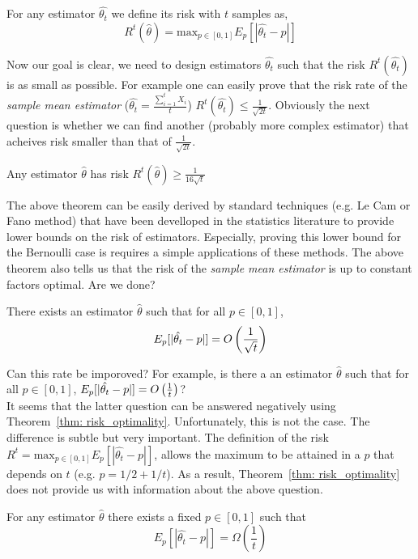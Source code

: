 \begin{definition}
For any estimator $\hat{\theta_t}$ we define its risk with $t$ samples as, $$R^t(\hat{\theta})=\text{max}_{p \in [0,1]}E_p[|\hat{\theta_t} - p|]$$
\end{definition}Now our goal is clear, we need to design estimators $\hat{\theta_t}$ such that the risk $R^t(\hat{\theta_t})$ is as small as possible. For example one can easily prove that the risk rate of the \emph{sample mean estimator} ($\hat{\theta_t}= \frac{\sum_{i=1}^t X_i}{t}$) $R^t(\hat{\theta_t}) \leq \frac{1}{\sqrt{2t}}$. Obviously the next question is whether we can find another (probably more complex estimator) that acheives risk smaller than that of $\frac{1}{\sqrt{2t}}$.   

\begin{theorem}\label{thm: risk_optimality}
Any estimator $\hat{\theta}$ has risk $R^t(\hat{\theta}) \geq \frac{1}{16\sqrt{t}}$
\end{theorem}
The above theorem can be easily derived by standard techniques (e.g. Le Cam or Fano method) that have been develloped in the statistics literature to provide lower bounds on the risk of estimators. Especially, proving this lower bound for the Bernoulli case is requires a simple applications of these methods. The above theorem also tells us that the risk of the \emph{sample mean estimator} is up to constant factors optimal. Are we done?

\begin{theorem}
There exists an estimator $\hat{\theta}$ such that for all $p\in[0,1]$, $$E_p[|\hat{\theta_t} - p|] = O\left(\frac{1}{\sqrt{t}}\right)$$ 
\end{theorem} Can this rate be imporoved? For example, is there a an estimator $\hat{\theta}$ such that for all $p\in [0,1]$, $E_p[|\hat{\theta_t} - p|] = O\left(\frac{1}{t}\right)$?\\

\noindent It seems that the latter question can be answered negatively using Theorem~\ref{thm: risk_optimality}. Unfortunately, this is not the case. The difference is subtle but very important. The definition of the risk $R^t = \text{max}_{p \in [0,1]}E_p[|\hat{\theta_t}-p|]$, allows the maximum to be attained in a $p$ that depends on $t$ (e.g. $p=1/2+1/t$). As a result, Theorem~\ref{thm: risk_optimality} does not provide us with information about the above question.


\begin{theorem}
For any estimator $\hat{\theta}$ there exists a fixed $p\in[0,1]$ such that $$E_p[|\hat{\theta_t} - p|] = \Omega(\frac{1}{t})$$
\end{theorem}

